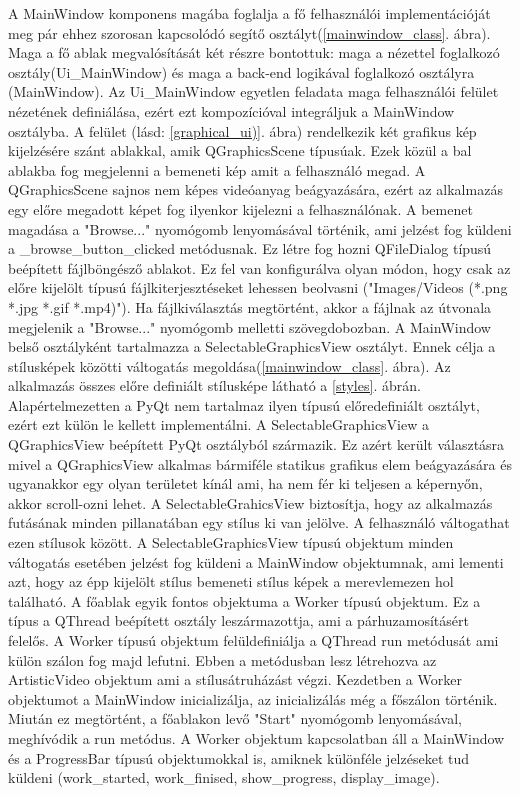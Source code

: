\documentclass[12pt, a4paper, oneside]{book}
\theoremstyle{tetel}
\begin{document}
A MainWindow komponens magába foglalja a fő felhasználói implementációját meg pár ehhez szorosan kapcsolódó segítő osztályt(\ref{mainwindow_class}. ábra). Maga a fő ablak megvalósítását két részre bontottuk: maga a nézettel foglalkozó osztály(Ui\_MainWindow) és maga a back-end logikával foglalkozó osztályra (MainWindow). Az Ui\_MainWindow egyetlen feladata maga felhasználói felület nézetének definiálása, ezért ezt kompozícióval integráljuk a MainWindow osztályba. A felület (lásd: \ref{graphical_ui)}. ábra) rendelkezik két grafikus kép kijelzésére szánt ablakkal, amik QGraphicsScene típusúak. Ezek közül a bal ablakba fog megjelenni a bemeneti kép amit a felhasználó megad. A QGraphicsScene sajnos nem képes videóanyag beágyazására, ezért az alkalmazás egy előre megadott képet fog ilyenkor kijelezni a felhasználónak. 
\newline
\indent
A bemenet magadása a "Browse..." nyomógomb lenyomásával történik, ami jelzést fog küldeni a \_browse\_button\_clicked metódusnak. Ez létre fog hozni QFileDialog típusú beépített fájlböngésző ablakot. Ez fel van konfigurálva olyan módon, hogy csak az előre kijelölt típusú fájlkiterjesztéseket lehessen beolvasni ("Images/Videos (*.png *.jpg *.gif *.mp4)"). Ha fájlkiválasztás megtörtént, akkor a fájlnak az útvonala megjelenik a "Browse..." nyomógomb melletti szövegdobozban.
\newline
\indent
A MainWindow belső osztályként tartalmazza a SelectableGraphicsView osztályt. Ennek célja a stílusképek közötti váltogatás megoldása(\ref{mainwindow_class}. ábra). Az alkalmazás összes előre definiált stílusképe látható a \ref{styles}. ábrán. Alapértelmezetten a PyQt nem tartalmaz ilyen típusú előredefiniált osztályt, ezért ezt külön le kellett implementálni. A SelectableGraphicsView a QGraphicsView beépített PyQt osztályból származik. Ez azért került választásra mivel a QGraphicsView alkalmas bármiféle statikus grafikus elem beágyazására és ugyanakkor egy olyan területet kínál ami, ha nem fér ki teljesen a képernyőn, akkor scroll-ozni lehet. A SelectableGrahicsView biztosítja, hogy az alkalmazás futásának minden pillanatában egy stílus ki van jelölve. A felhasználó váltogathat ezen stílusok között. A SelectableGraphicsView típusú objektum minden váltogatás esetében jelzést fog küldeni a MainWindow objektumnak, ami lementi azt, hogy az épp kijelölt stílus bemeneti stílus képek a merevlemezen hol található.
\newline
\indent
A főablak egyik fontos objektuma a Worker típusú objektum. Ez a típus a QThread beépített osztály leszármazottja, ami a párhuzamosításért felelős. A Worker típusú objektum felüldefiniálja a QThread run metódusát ami külön szálon fog majd lefutni. Ebben a metódusban lesz létrehozva az ArtisticVideo objektum ami a stílusátruházást végzi. Kezdetben a Worker objektumot a MainWindow inicializálja, az inicializálás még a főszálon történik. Miután ez megtörtént, a főablakon levő "Start" nyomógomb lenyomásával, meghívódik a run metódus. A Worker objektum kapcsolatban áll a MainWindow és a ProgressBar típusú objektumokkal is, amiknek különféle jelzéseket tud küldeni (work\_started, work\_finised, show\_progress, display\_image).
\end{document}
